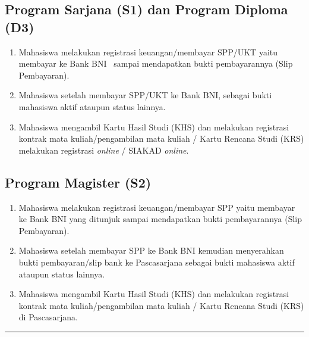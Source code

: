 \documentclass[
]{book}
\providecommand{\tightlist}{%
  \setlength{\itemsep}{0pt}\setlength{\parskip}{0pt}}
\begin{document}
\hypertarget{program-sarjana-s1-dan-program-diploma-d3}{%
\subsection{Program Sarjana (S1) dan Program Diploma (D3)}\label{program-sarjana-s1-dan-program-diploma-d3}}

\begin{enumerate}
\def\labelenumi{\arabic{enumi}.}
\tightlist
\item
  Mahasiswa melakukan registrasi keuangan/membayar SPP/UKT yaitu membayar ke Bank BNI~ sampai mendapatkan bukti pembayarannya (Slip Pembayaran).
\item
  Mahasiswa setelah membayar SPP/UKT ke Bank BNI, sebagai bukti mahasiswa aktif ataupun status lainnya.
\item
  Mahasiswa mengambil Kartu Hasil Studi (KHS) dan melakukan registrasi kontrak mata kuliah/pengambilan mata kuliah / Kartu Rencana Studi (KRS) melakukan registrasi \emph{online} / SIAKAD \emph{online}.
\end{enumerate}

\hypertarget{program-magister-s2}{%
\subsection{Program Magister (S2)}\label{program-magister-s2}}

\begin{enumerate}
\def\labelenumi{\arabic{enumi}.}
\tightlist
\item
  Mahasiswa melakukan registrasi keuangan/membayar SPP yaitu membayar ke Bank BNI yang ditunjuk sampai mendapatkan bukti pembayarannya (Slip Pembayaran).
\item
  Mahasiswa setelah membayar SPP ke Bank BNI kemudian menyerahkan bukti pembayaran/slip bank ke Pascasarjana sebagai bukti mahasiswa aktif ataupun status lainnya.
\item
  Mahasiswa mengambil Kartu Hasil Studi (KHS) dan melakukan registrasi kontrak mata kuliah/pengambilan mata kuliah / Kartu Rencana Studi (KRS) di Pascasarjana.
\end{enumerate}

\begin{center}\rule{0.5\linewidth}{0.5pt}\end{center}
\end{document}
